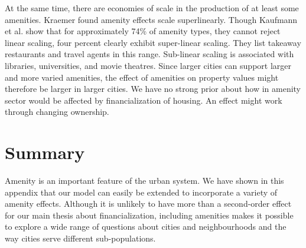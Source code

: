 At the same time, there are economies of scale in the production of at least some amenities. 
Kraemer \cite{kraemerCulturalSustainabilityUS2022} found amenity effects scale superlinearly. Though Kaufmann et al. \cite{kaufmannScalingUrbanAmenities2022}  show that %
for approximately 74\% of amenity types, they cannot reject linear scaling, four percent clearly exhibit super-linear scaling. They list takeaway restaurants and travel agents in this range. Sub-linear scaling is associated with libraries, universities, and movie theatres. Since larger cities can support larger and more varied amenities, the effect of amenities on property values might therefore be larger in larger cities. 
We have no strong prior about how in amenity sector would be affected by financialization of housing.  An effect might work through changing ownership.

  
\section{Summary}
Amenity is an important feature of the urban system. We have shown in this appendix that our model can easily be extended to incorporate a variety of amenity effects.  Although it is unlikely to have more than a second-order effect for our main thesis about financialization, including amenities makes it possible to explore a wide range of questions about cities and neighbourhoods and the way cities serve different sub-populations. 
\newpage

